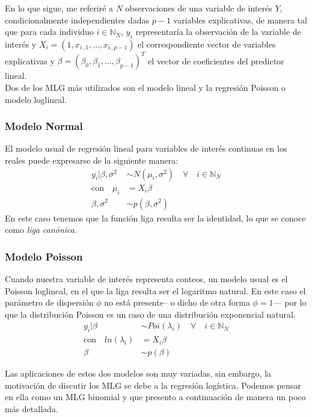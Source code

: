 En lo que sigue, me referiré a $N$ observaciones de una variable de interés $Y$, condicionalmente independientes dadas $p-1$ variables explicativas, de manera tal que para cada individuo $i\in \mathbb{N}_N$, $y_i$ representaría la observación de la variable de interés y $X_i = (1, x_{i\,,1}, \dots ,x_{i\,,p-1})$ el correspondiente vector de variables explicativas y $\beta=(\beta_0, \beta_1, \dots, \beta_{p-1})^T$ el vector de coeficientes del predictor lineal.\\

Dos de los MLG más utilizados son el modelo lineal y la regresión Poisson o modelo loglineal.  

\subsubsection*{Modelo Normal}

El modelo usual de regresión lineal para variables de interés continuas en los reales puede expresarse de la siguiente manera: 
\begin{align} \label{eq:MLG_Normal}
y_i|\beta,\sigma^2 & \sim N(\mu_i,\sigma^2) \quad \forall \quad i \in \mathbb{N}_N \nonumber \\
\text{con} \quad \mu_i &= X_i\beta \nonumber \\
\beta,\sigma^2 &\sim p(\beta,\sigma^2)
\end{align}
En este caso tenemos que la función liga resulta ser la identidad, lo que se conoce como \textit{liga canónica}. 

\subsubsection*{Modelo Poisson}

Cuando nuestra variable de interés representa conteos, un modelo usual es el Poisson loglineal, en el que la liga resulta ser el logaritmo natural. En este caso el parámetro de dispersión $\phi$ no está presente-- o dicho de otra forma $\phi=1$--- por lo que la distribución Poisson es un caso de una distribución exponencial natural. 
\begin{align} \label{eq:MLG_Poi}
y_i|\beta & \sim Poi(\lambda_i) \quad \forall \quad i \in \mathbb{N}_N \nonumber \\
\text{con} \quad ln(\lambda_i) &= X_i\beta \nonumber \\
\beta &\sim p(\beta)
\end{align}

Las aplicaciones de estos dos modelos son muy variadas, sin embargo, la motivación de discutir los MLG se debe a la regresión logística. Podemos pensar en ella como un MLG binomial y que presento a continuación de manera un poco más detallada. 

